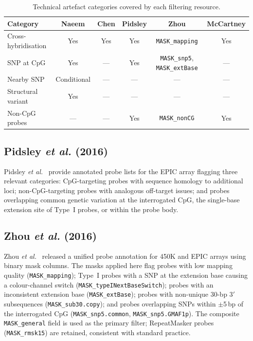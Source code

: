 \begin{table}[t]
\centering
\caption{Technical artefact categories covered by each filtering resource.}
\label{tab:filter_categories}
\scriptsize
\begin{tabular}{l c c c c c}
\toprule
\textbf{Category} &
\textbf{Naeem} &
\textbf{Chen} &
\textbf{Pidsley} &
\textbf{Zhou} &
\textbf{McCartney} \\
\midrule
Cross-hybridisation &
Yes & Yes & Yes & \texttt{MASK\_mapping} & Yes \\
SNP at CpG &
Yes & --- & Yes & \texttt{MASK\_snp5}, \texttt{MASK\_extBase} & --- \\
Nearby SNP &
Conditional & --- & --- & --- & --- \\
Structural variant &
Yes & --- & --- & --- & --- \\
Non-CpG probes &
--- & --- & Yes & \texttt{MASK\_nonCG} & Yes \\
\bottomrule
\end{tabular}
\end{table}

\subsection{Pidsley \textit{et al.} (2016)}
\label{app:pidsley2016}

Pidsley \textit{et al.}~\cite{Pidsley2016} provide annotated probe lists for
the EPIC array flagging three relevant categories: CpG-targeting probes with
sequence homology to additional loci; non-CpG-targeting probes with analogous
off-target issues; and probes overlapping common genetic variation at the
interrogated CpG, the single-base extension site of Type~I probes, or within
the probe body.

\subsection{Zhou \textit{et al.} (2016)}
\label{app:zhou2016}

Zhou \textit{et al.}~\cite{zhou2016} released a unified probe annotation for
450K and EPIC arrays using binary mask columns. The masks applied here flag
probes with low mapping quality (\texttt{MASK\_mapping}); Type~I probes with
a SNP at the extension base causing a colour-channel switch
(\texttt{MASK\_typeINextBaseSwitch}); probes with an inconsistent extension base
(\texttt{MASK\_extBase}); probes with non-unique 30-bp 3$'$ subsequences
(\texttt{MASK\_sub30.copy}); and probes overlapping SNPs within $\pm$5\,bp of
the interrogated CpG (\texttt{MASK\_snp5.common}, \texttt{MASK\_snp5.GMAF1p}).
The composite \texttt{MASK\_general} field is used as the primary filter;
RepeatMasker probes (\texttt{MASK\_rmsk15}) are retained, consistent with
standard practice.


